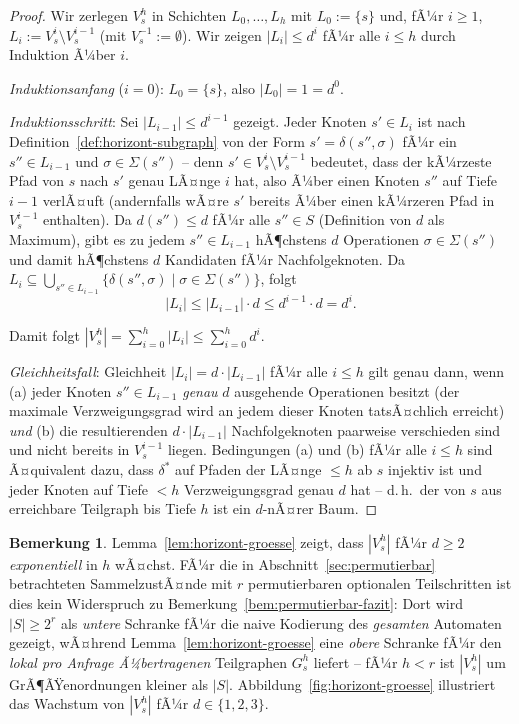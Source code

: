 ﻿\documentclass[a4paper,12pt]{article}
\theoremstyle{definition}
\newtheorem{bemerkung}{Bemerkung}
\begin{document}
\begin{proof}
	Wir zerlegen $V_s^h$ in Schichten $L_0,\ldots,L_h$ mit $L_0:=\{s\}$ und, fÃ¼r
	$i\ge1$, $L_i:=V_s^i\setminus V_s^{i-1}$ (mit $V_s^{-1}:=\emptyset$). Wir zeigen
	$|L_i|\le d^i$ fÃ¼r alle $i\le h$ durch Induktion Ã¼ber $i$.

	\emph{Induktionsanfang} ($i=0$): $L_0=\{s\}$, also $|L_0|=1=d^0$.

	\emph{Induktionsschritt}: Sei $|L_{i-1}|\le d^{i-1}$ gezeigt. Jeder Knoten
	$s'\in L_i$ ist nach Definition~\ref{def:horizont-subgraph} von der Form
	$s'=\delta(s'',\sigma)$ fÃ¼r ein $s''\in L_{i-1}$ und $\sigma\in\Sigma(s'')$ -- denn
	$s'\in V_s^i\setminus V_s^{i-1}$ bedeutet, dass der kÃ¼rzeste Pfad von $s$ nach $s'$
	genau LÃ¤nge $i$ hat, also Ã¼ber einen Knoten $s''$ auf Tiefe $i-1$ verlÃ¤uft
	(andernfalls wÃ¤re $s'$ bereits Ã¼ber einen kÃ¼rzeren Pfad in $V_s^{i-1}$ enthalten).
	Da $d(s'')\le d$ fÃ¼r alle $s''\in S$ (Definition von $d$ als Maximum), gibt es zu
	jedem $s''\in L_{i-1}$ hÃ¶chstens $d$ Operationen $\sigma\in\Sigma(s'')$ und damit
	hÃ¶chstens $d$ Kandidaten fÃ¼r Nachfolgeknoten. Da
	$L_i\subseteq\bigcup_{s''\in L_{i-1}}\{\delta(s'',\sigma)\mid\sigma\in\Sigma(s'')\}$,
	folgt
	\[
		|L_i| \le |L_{i-1}|\cdot d \le d^{i-1}\cdot d = d^i.
	\]

	Damit folgt $|V_s^h|=\sum_{i=0}^{h}|L_i|\le\sum_{i=0}^{h}d^i$.

	\emph{Gleichheitsfall}: Gleichheit $|L_i|=d\cdot|L_{i-1}|$ fÃ¼r alle $i\le h$ gilt
	genau dann, wenn (a) jeder Knoten $s''\in L_{i-1}$ \emph{genau} $d$ ausgehende
	Operationen besitzt (der maximale Verzweigungsgrad wird an jedem dieser Knoten
	tatsÃ¤chlich erreicht) \emph{und} (b) die resultierenden $d\cdot|L_{i-1}|$
	Nachfolgeknoten paarweise verschieden sind und nicht bereits in $V_s^{i-1}$ liegen.
	Bedingungen (a) und (b) fÃ¼r alle $i\le h$ sind Ã¤quivalent dazu, dass $\delta^{*}$ auf
	Pfaden der LÃ¤nge $\le h$ ab $s$ injektiv ist und jeder Knoten auf Tiefe $<h$
	Verzweigungsgrad genau $d$ hat -- d.\,h.\ der von $s$ aus erreichbare Teilgraph bis
	Tiefe $h$ ist ein $d$-nÃ¤rer Baum. \qedhere
\end{proof}

\begin{bemerkung}
	\label{bem:horizont-groesse-praxis}
	Lemma~\ref{lem:horizont-groesse} zeigt, dass $|V_s^h|$ fÃ¼r $d\ge2$
	\emph{exponentiell} in $h$ wÃ¤chst. FÃ¼r die in Abschnitt~\ref{sec:permutierbar}
	betrachteten SammelzustÃ¤nde mit $r$ permutierbaren optionalen Teilschritten ist dies
	kein Widerspruch zu Bemerkung~\ref{bem:permutierbar-fazit}: Dort wird $|S|\ge2^r$ als
	\emph{untere} Schranke fÃ¼r die naive Kodierung des \emph{gesamten} Automaten gezeigt,
	wÃ¤hrend Lemma~\ref{lem:horizont-groesse} eine \emph{obere} Schranke fÃ¼r den
	\emph{lokal pro Anfrage Ã¼bertragenen} Teilgraphen $G_s^h$ liefert -- fÃ¼r $h<r$ ist
	$|V_s^h|$ um GrÃ¶ÃŸenordnungen kleiner als $|S|$. Abbildung~\ref{fig:horizont-groesse}
	illustriert das Wachstum von $|V_s^h|$ fÃ¼r $d\in\{1,2,3\}$.
\end{bemerkung}
\end{document}
